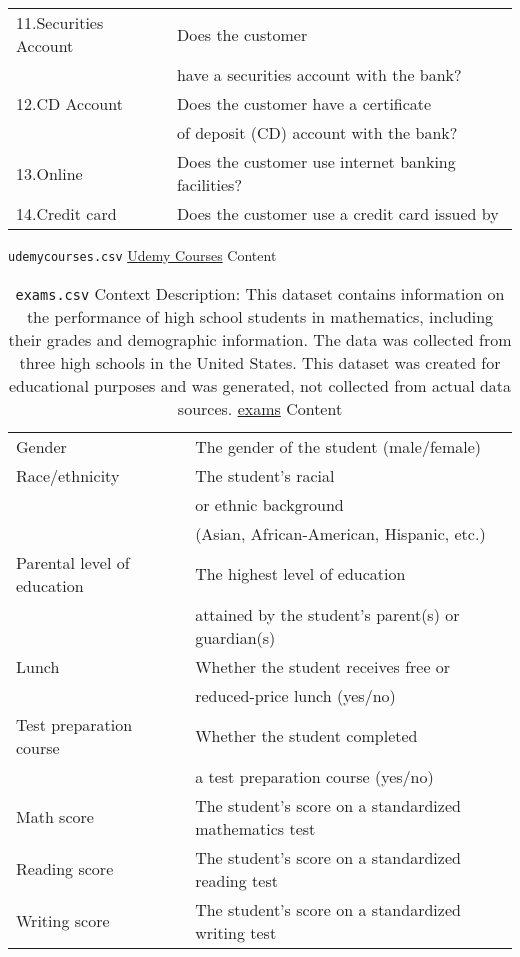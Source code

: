 \documentclass[12pt]{article}
\theoremstyle{remark}
\begin{document}
\begin{table}
\begin{tabular}{l|l}
11.Securities Account & Does the customer \\
& have a securities account with the bank?\\

12.CD Account & Does the customer have a certificate\\
& of deposit (CD) account with the bank?\\

13.Online & Does the customer use internet banking facilities?\\

14.Credit card & Does the customer use a credit card issued by\\
	\hline
	\end{tabular}
\end{table}




\begin{table}
	\caption{ \texttt{udemycourses.csv}
\href{https://www.kaggle.com/datasets/andrewmvd/udemy-courses?resource=download}{Udemy Courses} Content
}
\end{table}



\begin{table}
	\caption{ \texttt{exams.csv}
Context
Description: This dataset contains information on the performance of high school students in mathematics, including their grades and demographic information. The data was collected from three high schools in the United States.
This dataset was created for educational purposes and was generated, not collected from actual data sources.
\href{https://www.kaggle.com/datasets/rkiattisak/student-performance-in-mathematics}{exams} Content
}
	\begin{tabular}{l|l}\hline
Gender & The gender of the student (male/female)\\
Race/ethnicity & The student's racial \\ & or ethnic background \\ & (Asian, African-American, Hispanic, etc.)\\
Parental level of education & The highest level of education \\ & attained by the student's parent(s) or guardian(s)\\
Lunch & Whether the student receives free or \\ & reduced-price lunch (yes/no)\\
Test preparation course & Whether the student completed \\ & a test preparation course (yes/no)\\
Math score & The student's score on a standardized mathematics test\\
Reading score & The student's score on a standardized reading test\\
Writing score & The student's score on a standardized writing test\\
	\hline
	\end{tabular}
\end{table}
%
\end{document}
